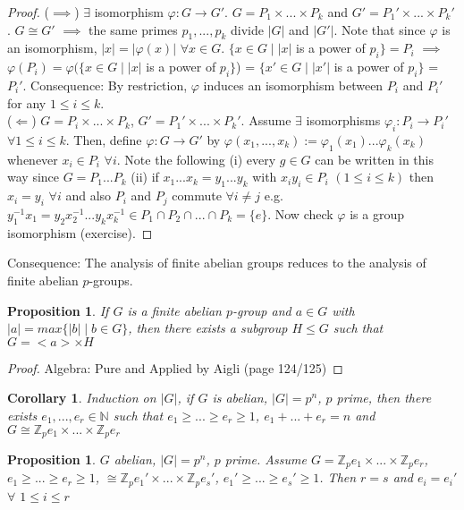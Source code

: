\documentclass[11pt]{article}
\newtheorem{prop}[thm]{Proposition}
\newtheorem{cor}[thm]{Corollary}
\theoremstyle{definition}
\numberwithin{equation}{section}
\newcommand{\Z}{\mathbb{Z}}
\newcommand{\N}{\mathbb{N}} %
\begin{document}
\begin{proof}
($\implies$) $\exists$ isomorphism $\varphi: G \rightarrow G'$. $G = P_{1} \times...\times P_{k}$ and $G' = P_{1}' \times...\times P_{k}'$. $G \cong G'$ $\implies$ the same primes $p_1,...,p_k$ divide $|G|$ and $|G'|$. Note that since $\varphi$ is an isomorphism, $|x| = |\varphi(x)|$ $\forall x \in G$. $\{x \in G \mid |x|$ is a power of $p_i \} = P_i$ $\implies$ $\varphi(P_i) = \varphi(\{x \in G \mid |x|$ is a power of $p_i \}$) = $\{x' \in G \mid |x'|$ is a power of $p_i \}$ = $P_{i}'$. Consequence: By restriction, $\varphi$ induces an isomorphism between $P_i$ and $P_{i}'$ for any $1 \leq i \leq k$.\\
($\Leftarrow$) $G = P_{i} \times...\times P_{k}$, $G' = P_{1}' \times...\times P_{k}'$. Assume $\exists$ isomorphisms $\varphi_i : P_{i} \rightarrow P_{i}'$ $\forall 1 \leq i \leq k$. Then, define $\varphi: G \rightarrow G'$ by $\varphi(x_{1},...,x_{k}) := \varphi_{1}(x_1)...\varphi_{k}(x_k)$ whenever $x_i \in P_i$ $\forall i$. Note the following (i) every $g \in G$ can be written in this way since $G = P_1...P_k$ (ii) if $x_1...x_k = y_1...y_k$ with $x_{i}y_{i} \in P_i$ $(1 \leq i \leq k)$ then $x_i = y_i$ $\forall i$ and also $P_i$ and $P_j$ commute $\forall i \neq j$ e.g. $y_1^{-1}x_{1} = y_{2}x_{2}^{-1}...y_{k}x_{k}^{-1} \in P_{1} \cap P_{2} \cap...\cap P_{k} = \{e\}$. Now check $\varphi$ is a group isomorphism (exercise).
\end{proof}
Consequence: The analysis of finite abelian groups reduces to the analysis of finite abelian $p$-groups.
\begin{prop}
If $G$ is a finite abelian $p$-group and $a \in G$ with $|a| = max\{|b| \mid b \in G\}$, then there exists a subgroup $H \leq G$ such that $G = <a> \times H$
\end{prop}
\begin{proof}
Algebra: Pure and Applied by Aigli (page 124/125)
\end{proof}
\begin{cor}
Induction on $|G|$, if $G$ is abelian, $|G| = p^n$, $p$ prime, then there exists $e_1,...,e_r \in \N$ such that $e_1 \geq ... \geq e_r \geq 1$, $e_1 +...+ e_r = n$ and $G \cong \Z_{p}e_1 \times...\times \Z_{p}e_r$
\end{cor}
\begin{prop}
$G$ abelian, $|G| = p^{n}$, $p$ prime. Assume $G = \Z_{p}e_1 \times...\times \Z_{p}e_r$, $e_1 \geq ... \geq e_r \geq 1$, $\cong \Z_{p}e_{1}' \times...\times \Z_{p}e_{s}'$, $e_{1}' \geq ... \geq e_{s}' \geq 1$. Then $r = s$ and $e_{i} = e_{i}'$ $\forall$ $1 \leq i \leq r$
\end{prop}
\end{document}
